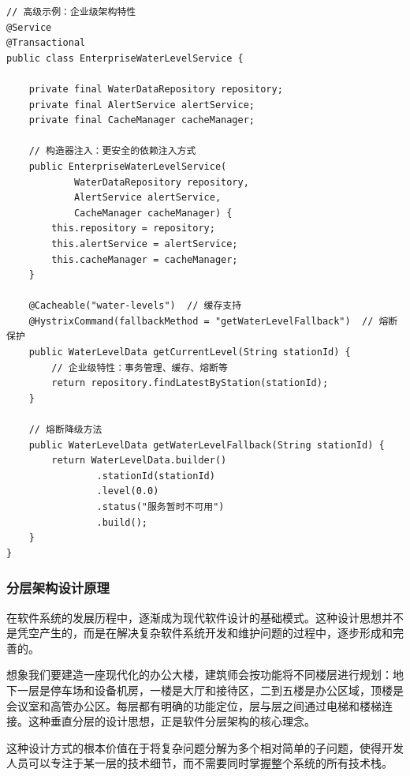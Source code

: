 \begin{lstlisting}[style=java]
// 高级示例：企业级架构特性
@Service
@Transactional
public class EnterpriseWaterLevelService {
    
    private final WaterDataRepository repository;
    private final AlertService alertService;
    private final CacheManager cacheManager;
    
    // 构造器注入：更安全的依赖注入方式
    public EnterpriseWaterLevelService(
            WaterDataRepository repository,
            AlertService alertService,
            CacheManager cacheManager) {
        this.repository = repository;
        this.alertService = alertService;
        this.cacheManager = cacheManager;
    }
    
    @Cacheable("water-levels")  // 缓存支持
    @HystrixCommand(fallbackMethod = "getWaterLevelFallback")  // 熔断保护
    public WaterLevelData getCurrentLevel(String stationId) {
        // 企业级特性：事务管理、缓存、熔断等
        return repository.findLatestByStation(stationId);
    }
    
    // 熔断降级方法
    public WaterLevelData getWaterLevelFallback(String stationId) {
        return WaterLevelData.builder()
                .stationId(stationId)
                .level(0.0)
                .status("服务暂时不可用")
                .build();
    }
}
\end{lstlisting}

\hypertarget{ux5206ux5c42ux67b6ux6784ux8bbeux8ba1ux539fux7406}{%
\subsubsection{分层架构设计原理}\label{ux5206ux5c42ux67b6ux6784ux8bbeux8ba1ux539fux7406}}

在软件系统的发展历程中，逐渐成为现代软件设计的基础模式。这种设计思想并不是凭空产生的，而是在解决复杂软件系统开发和维护问题的过程中，逐步形成和完善的。

想象我们要建造一座现代化的办公大楼，建筑师会按功能将不同楼层进行规划：地下一层是停车场和设备机房，一楼是大厅和接待区，二到五楼是办公区域，顶楼是会议室和高管办公区。每层都有明确的功能定位，层与层之间通过电梯和楼梯连接。这种垂直分层的设计思想，正是软件分层架构的核心理念。

这种设计方式的根本价值在于将复杂问题分解为多个相对简单的子问题，使得开发人员可以专注于某一层的技术细节，而不需要同时掌握整个系统的所有技术栈。

